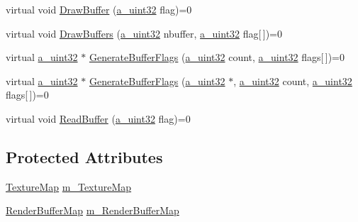 \begin{DoxyCompactItemize}
\item 
virtual void \hyperlink{class_agmd_1_1_frame_buffer_adf021c722b925f183980fb402fccec41}{Draw\+Buffer} (\hyperlink{_common_defines_8h_a964296f9770051b9e4807b1f180dd416}{a\+\_\+uint32} flag)=0
\item 
virtual void \hyperlink{class_agmd_1_1_frame_buffer_aa8c9362a32a4f8d83be2029adb341688}{Draw\+Buffers} (\hyperlink{_common_defines_8h_a964296f9770051b9e4807b1f180dd416}{a\+\_\+uint32} nbuffer, \hyperlink{_common_defines_8h_a964296f9770051b9e4807b1f180dd416}{a\+\_\+uint32} flag\mbox{[}$\,$\mbox{]})=0
\item 
virtual \hyperlink{_common_defines_8h_a964296f9770051b9e4807b1f180dd416}{a\+\_\+uint32} $\ast$ \hyperlink{class_agmd_1_1_frame_buffer_a4e08d994af258b09858b46e5b6ef47ed}{Generate\+Buffer\+Flags} (\hyperlink{_common_defines_8h_a964296f9770051b9e4807b1f180dd416}{a\+\_\+uint32} count, \hyperlink{_common_defines_8h_a964296f9770051b9e4807b1f180dd416}{a\+\_\+uint32} flags\mbox{[}$\,$\mbox{]})=0
\item 
virtual \hyperlink{_common_defines_8h_a964296f9770051b9e4807b1f180dd416}{a\+\_\+uint32} $\ast$ \hyperlink{class_agmd_1_1_frame_buffer_a797b28669a491bff2b4daa0e4ff3fa49}{Generate\+Buffer\+Flags} (\hyperlink{_common_defines_8h_a964296f9770051b9e4807b1f180dd416}{a\+\_\+uint32} $\ast$, \hyperlink{_common_defines_8h_a964296f9770051b9e4807b1f180dd416}{a\+\_\+uint32} count, \hyperlink{_common_defines_8h_a964296f9770051b9e4807b1f180dd416}{a\+\_\+uint32} flags\mbox{[}$\,$\mbox{]})=0
\item 
virtual void \hyperlink{class_agmd_1_1_frame_buffer_a1425626719ded4e216ecf6c9667151eb}{Read\+Buffer} (\hyperlink{_common_defines_8h_a964296f9770051b9e4807b1f180dd416}{a\+\_\+uint32} flag)=0
\end{DoxyCompactItemize}
\subsection*{Protected Attributes}
\begin{DoxyCompactItemize}
\item 
\hyperlink{namespace_agmd_aee41a562679bc3f0f62073c46a692c4c}{Texture\+Map} \hyperlink{class_agmd_1_1_frame_buffer_a5a14e4858f1ddf4b213ec903d90b35ef}{m\+\_\+\+Texture\+Map}
\item 
\hyperlink{namespace_agmd_a6e9a7cfb1414faf52f6290cf604872a9}{Render\+Buffer\+Map} \hyperlink{class_agmd_1_1_frame_buffer_aae5914f57aa6d790bd89df6e016b2f04}{m\+\_\+\+Render\+Buffer\+Map}
\end{DoxyCompactItemize}



